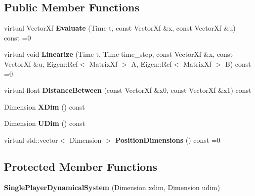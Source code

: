 \subsection*{Public Member Functions}
\begin{DoxyCompactItemize}
\item 
virtual Vector\+Xf {\bfseries Evaluate} (Time t, const Vector\+Xf \&x, const Vector\+Xf \&u) const =0\hypertarget{classilqgames_1_1_single_player_dynamical_system_a6a6fdd6eaf0fd0171d8f87a1648e3320}{}\label{classilqgames_1_1_single_player_dynamical_system_a6a6fdd6eaf0fd0171d8f87a1648e3320}

\item 
virtual void {\bfseries Linearize} (Time t, Time time\+\_\+step, const Vector\+Xf \&x, const Vector\+Xf \&u, Eigen\+::\+Ref$<$ Matrix\+Xf $>$ A, Eigen\+::\+Ref$<$ Matrix\+Xf $>$ B) const =0\hypertarget{classilqgames_1_1_single_player_dynamical_system_a910d13c85415769ba434e6b423390fc9}{}\label{classilqgames_1_1_single_player_dynamical_system_a910d13c85415769ba434e6b423390fc9}

\item 
virtual float {\bfseries Distance\+Between} (const Vector\+Xf \&x0, const Vector\+Xf \&x1) const \hypertarget{classilqgames_1_1_single_player_dynamical_system_a2487c7603c1dc998799c0227d00904f3}{}\label{classilqgames_1_1_single_player_dynamical_system_a2487c7603c1dc998799c0227d00904f3}

\item 
Dimension {\bfseries X\+Dim} () const \hypertarget{classilqgames_1_1_single_player_dynamical_system_a54b50acd4d8eb613c5f1042e38a5f6fd}{}\label{classilqgames_1_1_single_player_dynamical_system_a54b50acd4d8eb613c5f1042e38a5f6fd}

\item 
Dimension {\bfseries U\+Dim} () const \hypertarget{classilqgames_1_1_single_player_dynamical_system_a24d4db1d3ad5450108eb22c412e606c1}{}\label{classilqgames_1_1_single_player_dynamical_system_a24d4db1d3ad5450108eb22c412e606c1}

\item 
virtual std\+::vector$<$ Dimension $>$ {\bfseries Position\+Dimensions} () const =0\hypertarget{classilqgames_1_1_single_player_dynamical_system_add0f6580940de79a76544496ec70d34a}{}\label{classilqgames_1_1_single_player_dynamical_system_add0f6580940de79a76544496ec70d34a}

\end{DoxyCompactItemize}
\subsection*{Protected Member Functions}
\begin{DoxyCompactItemize}
\item 
{\bfseries Single\+Player\+Dynamical\+System} (Dimension xdim, Dimension udim)\hypertarget{classilqgames_1_1_single_player_dynamical_system_aa83761473fdd007d641ff7a29e7c4fe1}{}\label{classilqgames_1_1_single_player_dynamical_system_aa83761473fdd007d641ff7a29e7c4fe1}

\end{DoxyCompactItemize}
